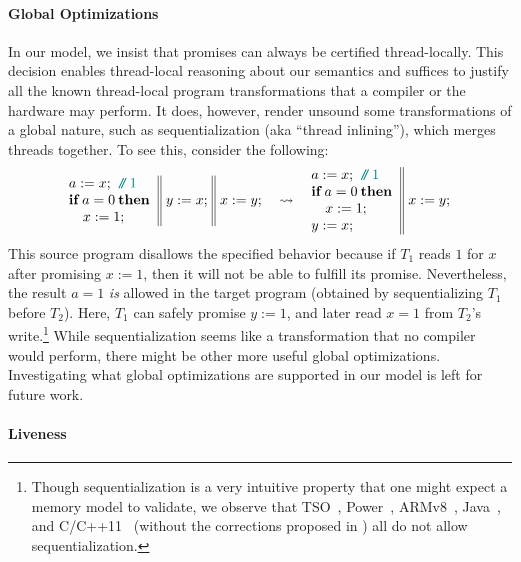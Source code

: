 \paragraph{Global Optimizations}
In our model, we insist that promises can always be certified thread-locally. 
This decision enables thread-local reasoning about our semantics and suffices
to justify all the known thread-local program transformations that a compiler
or the hardware may perform.  It does, however, render unsound some transformations of a global nature,
such as sequentialization (aka ``thread inlining''), which merges threads together.
To see this, consider the following:
$$\inarrIIId{
a:=x; \comment{1} \\
\itne{a=0}{}\\
\quad x:=1;
}{
y:=x;
}{
x:=y;
}\quad
\leadsto
\quad
\inarrIId{
a:=x; \comment{1} \\
\itne{a=0}{}\\
\quad x:=1; \\
y:=x;
}{
x:=y;
}
$$
This source program disallows the specified behavior because if $T_1$ reads $1$ for $x$ after promising $x:=1$, then
it will not be able to fulfill its promise.
Nevertheless, the result $a=1$ \emph{is} allowed in the target program 
(obtained by sequentializing $T_1$ before $T_2$).
Here, $T_1$ can safely promise $y:=1$, and later read $x=1$ from $T_2$'s 
write.\footnote{Though sequentialization is a very intuitive property that one might expect a memory
model to validate,
we observe that TSO~\cite{x86-tso}, Power~\cite{herding-cats}, ARMv8~\cite{arm8-model}, Java~\cite{jmm}, 
and C/C++11~\cite{Batty:2011} (without the corrections proposed in \cite{c11comp})
all do not allow sequentialization.
}
While sequentialization seems like a transformation that no compiler would perform, there might be other more useful global optimizations.
Investigating what global optimizations are supported in our model is left for future work.



\paragraph{Liveness}


